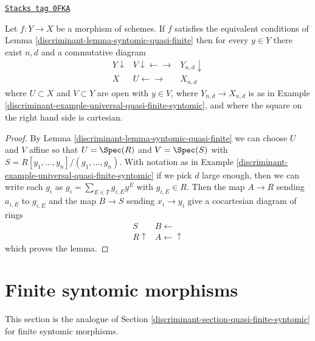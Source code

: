 \begin{lemma}
\label{discriminant-lemma-locally-comes-from-universal}
\href{https://stacks.math.columbia.edu/tag/0FKA}{\texttt{Stacks tag 0FKA}}

Let $f : Y \to X$ be a morphism of schemes. If $f$ satisfies the equivalent
conditions of Lemma \ref{discriminant-lemma-syntomic-quasi-finite} then for every
$y \in Y$ there exist $n, d$ and a commutative diagram
$$
\begin{array}{ccc}Y \downarrow & V \downarrow\longleftarrow\longrightarrow & Y_{n, d} \downarrow \\ X & U \longleftarrow\longrightarrow & X_{n, d}\end{array}
$$
where $U \subset X$ and $V \subset Y$ are open with $y \in V$,
where $Y_{n, d} \to X_{n, d}$
is as in Example \ref{discriminant-example-universal-quasi-finite-syntomic}, and
where the square on the right hand side is cartesian.
\end{lemma}

\begin{proof}

By Lemma \ref{discriminant-lemma-syntomic-quasi-finite}
we can choose $U$ and $V$ affine so that
$U = \Spec(R)$ and $V = \Spec(S)$ with
$S = R[y_1, \ldots, y_n]/(g_1, \ldots, g_n)$.
With notation as in Example \ref{discriminant-example-universal-quasi-finite-syntomic}
if we pick $d$ large enough, then we can write each $g_i$ as
$g_i = \sum_{E \in T} g_{i, E}y^E$ with $g_{i, E} \in R$.
Then the map $A \to R$ sending $a_{i, E}$ to $g_{i, E}$
and the map $B \to S$ sending $x_i \to y_i$ give a cocartesian
diagram of rings
$$
\begin{array}{cc}S & B \longleftarrow \\ R \uparrow & A \longleftarrow\uparrow\end{array}
$$
which proves the lemma.
\end{proof}

\section{Finite syntomic morphisms}
\label{discriminant-section-finite-syntomic}
This section is the analogue of Section \ref{discriminant-section-quasi-finite-syntomic}
for finite syntomic morphisms.

